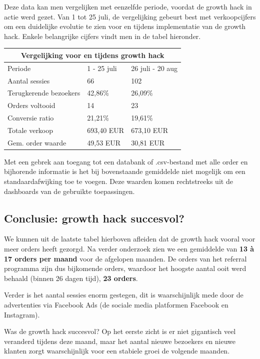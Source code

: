 Deze data kan men vergelijken met eenzelfde periode, voordat de growth hack in actie werd gezet. Van 1 tot 25 juli, de vergelijking gebeurt best met verkoopcijfers om een duidelijke evolutie te zien voor en tijdens implementatie van  de growth hack. Enkele belangrijke cijfers vindt men in de tabel hieronder.


\begin{tabular}{ |p{4cm}||p{3cm}|p{3cm}|  }
	\hline
	\multicolumn{3}{|c|}{Vergelijking voor en tijdens growth hack} \\
	\hline
	Periode & 1 - 25 juli &26 juli - 20 aug\\
	\hline
	Aantal sessies   & 66    &102\\
	Terugkerende bezoekers   & 42,86\%    &26,09\%\\
	Orders voltooid&   14  & 23\\
	Conversie ratio &21,21\% & 19,61\%\\
	Totale verkoop    &693,40 EUR & 673,10 EUR\\
	Gem. order waarde    &49,53  EUR& 30,81 EUR\\
	\hline
\end{tabular}

Met een gebrek aan toegang tot een databank of .csv-bestand met alle order en bijhorende informatie is het bij bovenstaande gemiddelde niet mogelijk om een standaardafwijking toe te voegen. Deze waarden komen rechtstreeks uit de dashboards van de gebruikte toepassingen.

\subsection{Conclusie: growth hack succesvol?} \label{sec:conclusie-growth-hack-succesvol}
We kunnen uit de laatste tabel hierboven afleiden dat de growth hack vooral voor meer orders heeft gezorgd. Na verder onderzoek zien we een gemiddelde van \textbf{13 à 17 orders per maand} voor de afgelopen maanden. De orders van het referral programma zijn dus bijkomende orders, waardoor het hoogste aantal ooit werd behaald (binnen 26 dagen tijd), \textbf{23 orders}.

Verder is het aantal sessies enorm gestegen, dit is waarschijnlijk mede door de advertenties via Facebook Ads (de sociale media platformen Facebook en Instagram). 

Was de growth hack succesvol? Op het eerste zicht is er niet gigantisch veel veranderd tijdens deze maand, maar het aantal nieuwe bezoekers en nieuwe klanten zorgt waarschijnlijk voor een stabiele groei de volgende maanden. 

